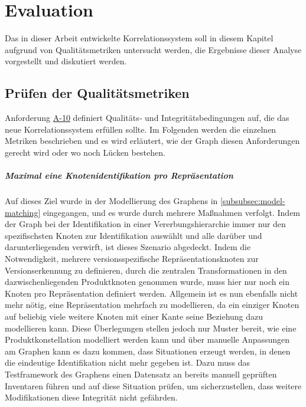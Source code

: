 \chapter{Evaluation}\label{ch:evaluation}

Das in dieser Arbeit entwickelte Korrelationssystem soll in diesem Kapitel aufgrund von Qualitätsmetriken untersucht werden, die Ergebnisse dieser Analyse vorgestellt und diskutiert werden.


\section{Prüfen der Qualitätsmetriken}

Anforderung \hyperref[subsec:req-graph-inner-consistency]{A-10} definiert Qualitäts‑ und Integritätsbedingungen auf, die das neue Korrelationssystem erfüllen sollte.
Im Folgenden werden die einzelnen Metriken beschrieben und es wird erläutert, wie der Graph diesen Anforderungen gerecht wird oder wo noch Lücken bestehen.

\paragraph{Maximal eine Knotenidentifikation pro Repräsentation}
Auf dieses Ziel wurde in der Modellierung des Graphens in \autoref{subsubsec:model-matching} eingegangen, und es wurde durch mehrere Maßnahmen verfolgt.
Indem der Graph bei der Identifikation in einer Vererbungshierarchie immer nur den spezifischsten Knoten zur Identifikation auswählt und alle darüber und darunterliegenden verwirft, ist dieses Szenario abgedeckt.
Indem die Notwendigkeit, mehrere versionsspezifische Repräsentationsknoten zur Versionserkennung zu definieren, durch die zentralen Transformationen in den dazwischenliegenden Produktknoten genommen wurde, muss hier nur noch ein Knoten pro Repräsentation definiert werden.
Allgemein ist es nun ebenfalls nicht mehr nötig, eine Repräsentation mehrfach zu modellieren, da ein einziger Knoten auf beliebig viele weitere Knoten mit einer Kante seine Beziehung dazu modellieren kann.
Diese Überlegungen stellen jedoch nur Muster bereit, wie eine Produktkonstellation modelliert werden kann und über manuelle Anpassungen am Graphen kann es dazu kommen, dass Situationen erzeugt werden, in denen die eindeutige Identifikation nicht mehr gegeben ist.
Dazu muss das Testframework des Graphens einen Datensatz an bereits manuell geprüften Inventaren führen und auf diese Situation prüfen, um sicherzustellen, dass weitere Modifikationen diese Integrität nicht gefährden.

